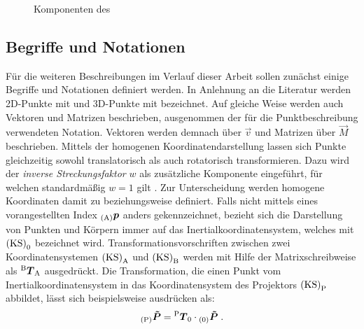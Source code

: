 \begin{figure}[ht]
	\begin{center}
		\caption{Komponenten des }
		\label{fig.components}
	\end{center}
\end{figure}

\prever{
}

\prever{
}

\subsection{Begriffe und Notationen}
Für die weiteren Beschreibungen im Verlauf dieser Arbeit sollen zunächst einige Begriffe und Notationen definiert werden. In Anlehnung an die Literatur \cite{Zhang2000} werden 2D-Punkte mit  und 3D-Punkte mit  bezeichnet. Auf gleiche Weise werden auch Vektoren und Matrizen beschrieben, ausgenommen der für die Punktbeschreibung verwendeten Notation. Vektoren werden demnach über $\vec{v}$ und Matrizen über $\vec{M}$ beschrieben. Mittels der homogenen Koordinatendarstellung lassen sich Punkte gleichzeitig sowohl translatorisch als auch rotatorisch transformieren. Dazu wird der \textit{inverse Streckungsfaktor} $w$ als zusätzliche Komponente eingeführt, für welchen standardmäßig $w=1$ gilt \cite{Nischwitz20111}. Zur Unterscheidung werden homogene Koordinaten damit zu  beziehungsweise  definiert. Falls nicht mittels eines vorangestellten Index ${_{{\mathrm{(A)}}}}\mbox{\boldmath{$p$}}$ anders gekennzeichnet, bezieht sich die Darstellung von Punkten und Körpern immer auf das Inertialkoordinatensystem, welches mit ${\mathrm{(KS)}}_{\mathrm{0}}$ bezeichnet wird. Transformationsvorschriften zwischen zwei Koordinatensystemen ${\mathrm{(KS)}}_{\mathrm{A}}$ und ${\mathrm{(KS)}}_{\mathrm{B}}$ werden mit Hilfe der Matrixschreibweise als ${^{\mathrm{B}}\mbox{\boldmath{$T$}}_{\mathrm{A}}}$ ausgedrückt. Die Transformation, die einen Punkt vom Inertialkoordinatensystem in das Koordinatensystem des Projektors ${\mathrm{(KS)}}_{\mathrm{P}}$ abbildet, lässt sich beispielsweise ausdrücken als:%
%
\begin{equation}
{_{{\mathrm{(P)}}}}\mbox{\boldmath{$\tilde{P}$}} = {^{\mathrm{P}}\mbox{\boldmath{$T$}}_{\mathrm{0}}}\cdot{_{{\mathrm{(0)}}}}\mbox{\boldmath{$\tilde{P}$}} \; \text{.}
\end{equation}

\prever{
}

